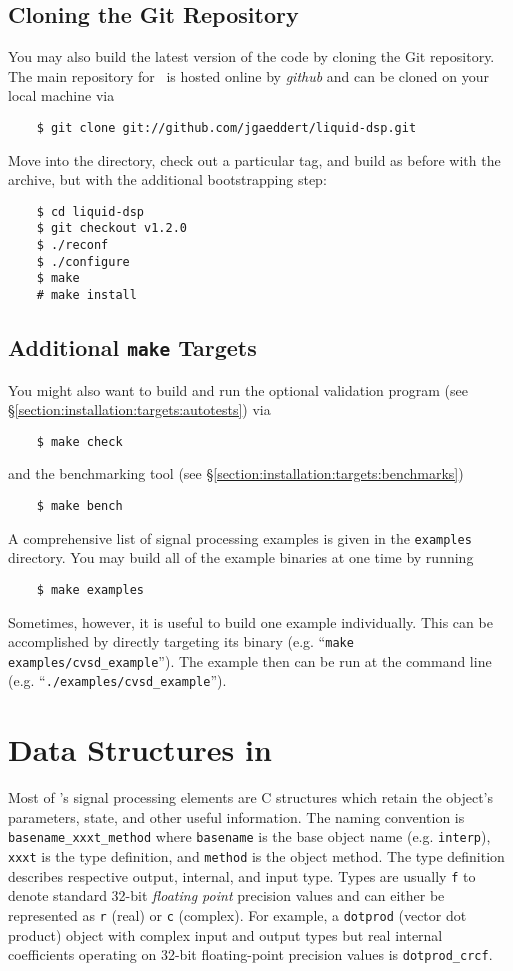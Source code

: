 \subsection{Cloning the Git Repository}
\label{section:quickstart:git}
%
You may also build the latest version of the code by cloning the
Git repository.
The main repository for \liquid\ is hosted online by {\em github}
\cite{github:web} and can be cloned on your local machine via
%
\begin{verbatim}
    $ git clone git://github.com/jgaeddert/liquid-dsp.git
\end{verbatim}
%
Move into the directory, check out a particular tag, and build as before
with the archive, but with the additional bootstrapping step:
%
\begin{verbatim}
    $ cd liquid-dsp
    $ git checkout v1.2.0
    $ ./reconf
    $ ./configure
    $ make
    # make install
\end{verbatim}
%

\subsection{Additional {\tt make} Targets}
\label{section:quickstart:targets}
%
You might also want to build and run the optional validation program
(see \S\ref{section:installation:targets:autotests}) via
\begin{verbatim}
    $ make check
\end{verbatim}
and the benchmarking tool
(see \S\ref{section:installation:targets:benchmarks})
\begin{verbatim}
    $ make bench
\end{verbatim}
%
A comprehensive list of signal processing examples is given in the
{\tt examples} directory.
You may build all of the example binaries at one time by running
\begin{verbatim}
    $ make examples
\end{verbatim}
%
Sometimes, however, it is useful to build one example individually.
This can be accomplished by directly targeting its binary
(e.g. ``{\tt make examples/cvsd\_example}'').
The example then can be run at the command line
(e.g. ``{\tt ./examples/cvsd\_example}'').

%
%
\section{Data Structures in \liquid}
\label{section:data_structures}
Most of \liquid's signal processing elements are C structures which
retain the object's parameters, state, and other useful information.
The naming convention is
{\tt basename\_xxxt\_method} where
{\tt basename} is the base object name (e.g. {\tt interp}),
{\tt xxxt} is the type definition, and
{\tt method} is the object method.
The type definition describes respective output, internal, and input type.
Types are usually {\tt f} to denote standard 32-bit {\it floating point}
precision values and can either be represented as {\tt r} (real) or {\tt c}
(complex).
For example, a {\tt dotprod} (vector dot product) object with complex input
and output types but real internal coefficients operating on 32-bit
floating-point precision values is {\tt dotprod\_crcf}.

